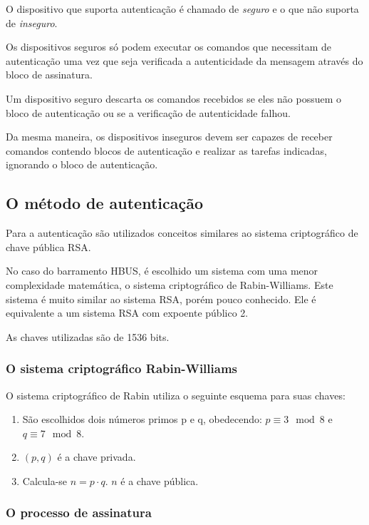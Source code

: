 \documentclass[11pt]{report}
\begin{document}
O dispositivo que suporta autenticação é chamado de \textit{seguro} e o que não suporta de \textit{inseguro}.

Os dispositivos seguros só podem executar os comandos que necessitam de autenticação uma vez que seja verificada a autenticidade da mensagem através do bloco de assinatura.

Um dispositivo seguro descarta os comandos recebidos se eles não possuem o bloco de autenticação ou se a verificação de autenticidade falhou.

Da mesma maneira, os dispositivos inseguros devem ser capazes de receber comandos contendo blocos de autenticação e realizar as tarefas indicadas, ignorando o bloco de autenticação.

\subsection{O método de autenticação}

Para a autenticação são utilizados conceitos similares ao sistema criptográfico de chave pública RSA.

No caso do barramento HBUS, é escolhido um sistema com uma menor complexidade matemática, o sistema criptográfico de Rabin-Williams. Este sistema é muito similar ao sistema RSA, porém pouco conhecido. Ele é equivalente a um sistema RSA com expoente público 2.

As chaves utilizadas são de 1536 bits.

\subsubsection{O sistema criptográfico Rabin-Williams}

O sistema criptográfico de Rabin utiliza o seguinte esquema para suas chaves:

\begin{enumerate}

\item São escolhidos dois números primos p e q, obedecendo: $p \equiv 3 \mod{8}$ e $q \equiv 7 \mod{8}$.

\item $\left({}p,q\right)$ é a chave privada.

\item Calcula-se $n=p\cdot{}q$. $n$ é a chave pública.

\end{enumerate}

\subsubsection{O processo de assinatura}
\end{document}
